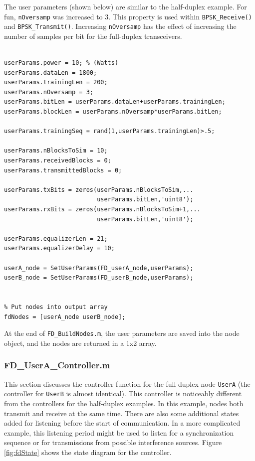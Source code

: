 The user parameters (shown below) are similar to the half-duplex
example.  For fun, \verb+nOversamp+ was increased to 3.  This
property is used within \verb+BPSK_Receive()+ and
\verb+BPSK_Transmit()+. Increasing \verb+nOversamp+ has the effect
of increasing the number of samples per bit for the full-duplex
transceivers.

\begin{lstlisting}[name=fdBuildNodes]
% Set user parameters

userParams.power = 10; % (Watts)
userParams.dataLen = 1800;
userParams.trainingLen = 200;
userParams.nOversamp = 3;
userParams.bitLen = userParams.dataLen+userParams.trainingLen;
userParams.blockLen = userParams.nOversamp*userParams.bitLen;

userParams.trainingSeq = rand(1,userParams.trainingLen)>.5;

userParams.nBlocksToSim = 10;
userParams.receivedBlocks = 0;
userParams.transmittedBlocks = 0;

userParams.txBits = zeros(userParams.nBlocksToSim,...
                          userParams.bitLen,'uint8');
userParams.rxBits = zeros(userParams.nBlocksToSim+1,...
                          userParams.bitLen,'uint8');

userParams.equalizerLen = 21;
userParams.equalizerDelay = 10;

userA_node = SetUserParams(FD_userA_node,userParams);
userB_node = SetUserParams(FD_userB_node,userParams);


% Put nodes into output array
fdNodes = [userA_node userB_node];
\end{lstlisting}

At the end of \verb+FD_BuildNodes.m+, the user parameters are saved
into the node object, and the nodes are returned in a 1x2 array.

\subsubsection{FD\_UserA\_Controller.m}

This section discusses the controller function for the full-duplex
node \verb+UserA+ (the controller for \verb+UserB+ is almost
identical).  This controller is noticeably different from the
controllers for the half-duplex examples.  In this example, nodes
both transmit and receive at the same time.  There are also some
additional states added for listening before the start of
communication.  In a more complicated example, this listening period
might be used to listen for a synchronization sequence or for
transmissions from possible interference sources.  Figure
\ref{fig:fdState} shows the state diagram for the controller.

